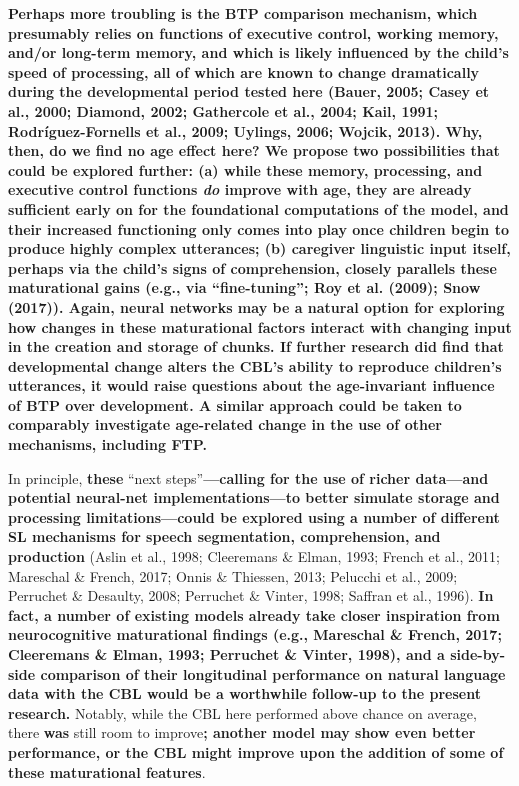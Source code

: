 \documentclass[
  english,
  man,mask,floatsintext]{apa6}
\begin{document}
\textbf{Perhaps more troubling is the BTP comparison mechanism, which presumably relies on functions of executive control, working memory, and/or long-term memory, and which is likely influenced by the child's speed of processing, all of which are known to change dramatically during the developmental period tested here (Bauer, 2005; Casey et al., 2000; Diamond, 2002; Gathercole et al., 2004; Kail, 1991; Rodríguez-Fornells et al., 2009; Uylings, 2006; Wojcik, 2013). Why, then, do we find no age effect here? We propose two possibilities that could be explored further: (a) while these memory, processing, and executive control functions \emph{do} improve with age, they are already sufficient early on for the foundational computations of the model, and their increased functioning only comes into play once children begin to produce highly complex utterances; (b) caregiver linguistic input itself, perhaps via the child's signs of comprehension, closely parallels these maturational gains (e.g., via \enquote{fine-tuning}; Roy et al. (2009); Snow (2017)). Again, neural networks may be a natural option for exploring how changes in these maturational factors interact with changing input in the creation and storage of chunks. If further research did find that developmental change alters the CBL's ability to reproduce children's utterances, it would raise questions about the age-invariant influence of BTP over development. A similar approach could be taken to comparably investigate age-related change in the use of other mechanisms, including FTP.}

In principle, \textbf{these} \enquote{next steps}\textbf{---calling for the use of richer data---and potential neural-net implementations---to better simulate storage and processing limitations---could be explored using a number of different SL mechanisms for speech segmentation, comprehension, and production} (Aslin et al., 1998; Cleeremans \& Elman, 1993; French et al., 2011; Mareschal \& French, 2017; Onnis \& Thiessen, 2013; Pelucchi et al., 2009; Perruchet \& Desaulty, 2008; Perruchet \& Vinter, 1998; Saffran et al., 1996). \textbf{In fact, a number of existing models already take closer inspiration from neurocognitive maturational findings (e.g., Mareschal \& French, 2017; Cleeremans \& Elman, 1993; Perruchet \& Vinter, 1998), and a side-by-side comparison of their longitudinal performance on natural language data with the CBL would be a worthwhile follow-up to the present research.} Notably, while the CBL here performed above chance on average, there \textbf{was} still room to improve\textbf{; another model may show even better performance, or the CBL might improve upon the addition of some of these maturational features}.
\end{document}
